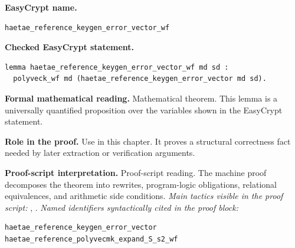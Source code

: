 \begin{formaltheorem}
\noindent\textbf{EasyCrypt name.}
\begin{lstlisting}[language=EasyCrypt,basicstyle=\ttfamily\scriptsize]
haetae_reference_keygen_error_vector_wf
\end{lstlisting}
\noindent\textbf{Checked EasyCrypt statement.}
\begin{lstlisting}[language=EasyCrypt,basicstyle=\ttfamily\scriptsize]
lemma haetae_reference_keygen_error_vector_wf md sd :
  polyveck_wf md (haetae_reference_keygen_error_vector md sd).
\end{lstlisting}
\noindent\textbf{Formal mathematical reading.}
Mathematical theorem. This lemma is a universally quantified proposition over the variables shown in the EasyCrypt statement.

\noindent\textbf{Role in the proof.}
Use in this chapter. It proves a structural correctness fact needed by later extraction or verification arguments.

\noindent\textbf{Proof-script interpretation.}
Proof-script reading. The machine proof decomposes the theorem into rewrites, program-logic obligations, relational equivalences, and arithmetic side conditions.
\emph{Main tactics visible in the proof script:} , .
\emph{Named identifiers syntactically cited in the proof block:}
\begin{lstlisting}[language=EasyCrypt,basicstyle=\ttfamily\scriptsize]
haetae_reference_keygen_error_vector
haetae_reference_polyvecmk_expand_S_s2_wf
\end{lstlisting}

\end{formaltheorem}

